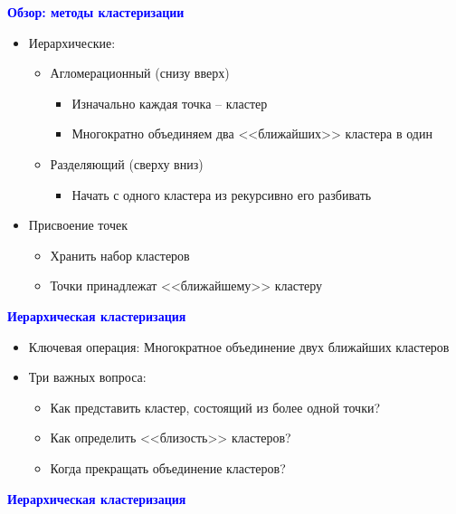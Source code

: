 \documentclass[landscape]{slides}
\begin{document}
\begin{normalsize}
\begin{slide}
\textbf{\textcolor{blue}{Обзор: методы кластеризации}}

\begin{itemize}
\item Иерархические:
  \begin{itemize}
  \item Агломерационный (снизу вверх)
    \begin{itemize}
    \item Изначально каждая точка -- кластер
    \item Многократно объединяем два <<ближайших>> кластера в один
    \end{itemize}
  \item Разделяющий (сверху вниз)
    \begin{itemize}
    \item Начать с одного кластера из рекурсивно его разбивать
    \end{itemize}
  \end{itemize}
\item Присвоение точек
  \begin{itemize}
  \item Хранить набор кластеров
  \item Точки принадлежат <<ближайшему>> кластеру
  \end{itemize}
\end{itemize}
\end{slide}



\begin{slide}
\textbf{\textcolor{blue}{Иерархическая кластеризация}}

\begin{itemize}
\item Ключевая операция: Многократное объединение двух ближайших кластеров
\item Три важных вопроса:
  \begin{itemize}
  \item Как представить кластер, состоящий из более одной точки?
  \item Как определить <<близость>> кластеров?
  \item Когда прекращать объединение кластеров?
  \end{itemize}
\end{itemize}
\end{slide}



\begin{slide}
\textbf{\textcolor{blue}{Иерархическая кластеризация}}


\end{slide}
\end{normalsize}
\end{document}
